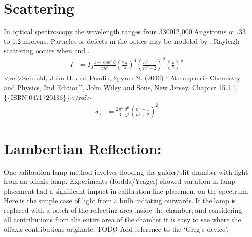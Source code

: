 \documentclass[letterpaper,10pt,english,openany,oneside]{sphinxmanual}
\begin{document}
\section{Scattering}
\label{\detokenize{physics:scattering}}
\sphinxAtStartPar
In optical spectroscopy the wavelength ranges from 3300\sphinxhyphen{}12,000 Angstroms
or .33 to 1.2 microns. Particles or defects in the optics may be
modeled by . Rayleigh scattering occurs when
 and .
\begin{equation}\label{equation:physics:RayleighIntensity}
\begin{split}I &= I_0 \frac{ 1+\cos^2 \theta }{2 R^2} \left( \frac{ 2 \pi }{ \lambda } \right)^4 \left( \frac{ n^2-1}{ n^2+2 } \right)^2 \left( \frac{d}{2} \right)^6\end{split}
\end{equation}
\sphinxAtStartPar
\textless{}ref\textgreater{}Seinfeld, John H. and Pandis, Spyros N. (2006) ‘’Atmospheric Chemistry and Physics, 2nd Edition’’, John Wiley and Sons, New Jersey, Chapter 15.1.1, \{\{ISBN|0471720186\}\}\textless{}/ref\textgreater{}
\begin{equation}\label{equation:physics:RayleighScattering}
\begin{split}\sigma_\text{s} &= \frac{ 2 \pi^5}{3} \frac{d^6}{\lambda^4} \left( \frac{ n^2-1}{ n^2+2 } \right)^2\end{split}
\end{equation}
\sphinxAtStartPar
{}


\section{Lambertian Reflection:}
\label{\detokenize{physics:lambertian-reflection}}
\sphinxAtStartPar
One calibration lamp method involves flooding the guider/slit chamber with
light from an off\sphinxhyphen{}axis lamp. Experiments (Rodda/Yeager) showed variation
in lamp placement had a significant impact in calibration line placement
on the spectrum. Here is the simple case of light from a bulb radiating
outwards. If the lamp is replaced with a patch of the reflecting area
inside the chamber; and considering all contributions from the entire
area of the chamber \textendash{} it is easy to see where the off\sphinxhyphen{}axis contributions
originate.  TODO Add reference to the ‘Greg’s device’.
\end{document}
